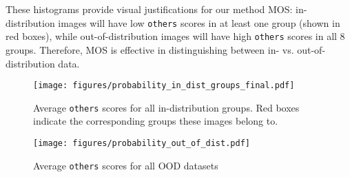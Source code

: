 \documentclass[final]{cvpr}
\begin{document}
These histograms provide visual justifications for our method MOS: in-distribution images will have low \texttt{others} scores in at least one group (shown in red boxes), while out-of-distribution images will have high \texttt{others} scores in all 8 groups. Therefore, MOS is effective in distinguishing between in- vs. out-of-distribution data.

\begin{figure*}[h]
    \centering
    \texttt{[image: figures/probability\_in\_dist\_groups\_final.pdf]}
    \caption{\small{Average \texttt{others} scores for all in-distribution groups. Red boxes indicate the corresponding groups these images belong to.}}
    \label{fig:score_in_dist_groups}
\end{figure*}

\begin{figure*}[h]
    \centering
    \texttt{[image: figures/probability\_out\_of\_dist.pdf]}
    \caption{\small{Average \texttt{others} scores for all OOD datasets}}
    \label{fig:score_ood_datasets}
\end{figure*}
\end{document}

